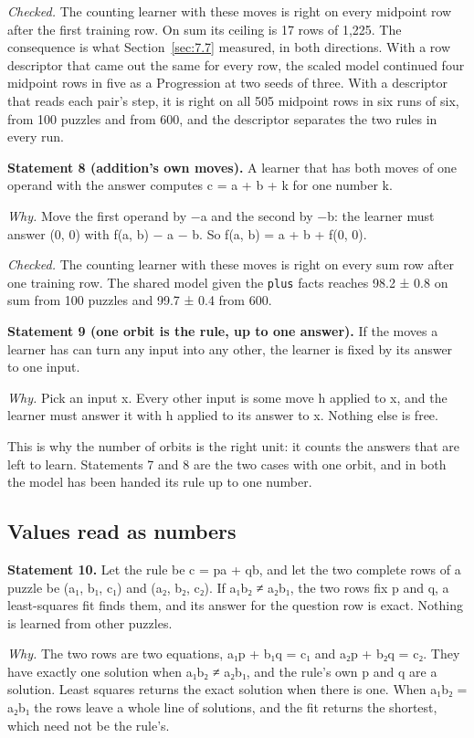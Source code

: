 \emph{Checked.} The counting learner with these moves is right on every midpoint row after the first training row. On sum its ceiling is 17 rows of 1,225. The consequence is what Section~\ref{sec:7.7} measured, in both directions. With a row descriptor that came out the same for every row, the scaled model continued four midpoint rows in five as a Progression at two seeds of three. With a descriptor that reads each pair's step, it is right on all 505 midpoint rows in six runs of six, from 100 puzzles and from 600, and the descriptor separates the two rules in every run.

\textbf{Statement 8 (addition's own moves).} A learner that has both moves of one operand with the answer computes c = a + b + k for one number k.

\emph{Why.} Move the first operand by −a and the second by −b: the learner must answer (0, 0) with f(a, b) − a − b. So f(a, b) = a + b + f(0, 0).

\emph{Checked.} The counting learner with these moves is right on every sum row after one training row. The shared model given the \texttt{plus} facts reaches 98.2 ± 0.8 on sum from 100 puzzles and 99.7 ± 0.4 from 600.

\textbf{Statement 9 (one orbit is the rule, up to one answer).} If the moves a learner has can turn any input into any other, the learner is fixed by its answer to one input.

\emph{Why.} Pick an input x. Every other input is some move h applied to x, and the learner must answer it with h applied to its answer to x. Nothing else is free.

This is why the number of orbits is the right unit: it counts the answers that are left to learn. Statements 7 and 8 are the two cases with one orbit, and in both the model has been handed its rule up to one number.

\subsection{Values read as numbers}\label{sec:3.6.5}

\textbf{Statement 10.} Let the rule be c = pa + qb, and let the two complete rows of a puzzle be (a₁, b₁, c₁) and (a₂, b₂, c₂). If a₁b₂ ≠ a₂b₁, the two rows fix p and q, a least-squares fit finds them, and its answer for the question row is exact. Nothing is learned from other puzzles.

\emph{Why.} The two rows are two equations, a₁p + b₁q = c₁ and a₂p + b₂q = c₂. They have exactly one solution when a₁b₂ ≠ a₂b₁, and the rule's own p and q are a solution. Least squares returns the exact solution when there is one. When a₁b₂ = a₂b₁ the rows leave a whole line of solutions, and the fit returns the shortest, which need not be the rule's.

